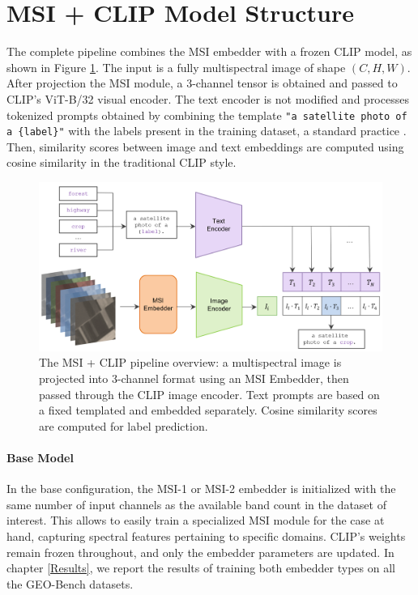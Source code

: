 \documentclass[a4paper, oneside, english]{sapthesis} %
\begin{document}
\section{MSI + CLIP Model Structure}

The complete pipeline combines the MSI embedder with a frozen CLIP model, as shown in Figure \ref{fig:model_pipeline}. The input is a fully multispectral image of shape $(C, H, W)$. After projection  the MSI module, a 3-channel tensor is obtained and passed to CLIP’s ViT-B/32 visual encoder. The text encoder is not modified and processes tokenized prompts obtained by combining the template \verb|"a satellite photo of a {label}"| with the labels present in the training dataset, a standard practice \cite{radford2021learning} \cite{liu2024remoteclip} \cite{zhang2024rs5m}. Then, similarity scores between image and text embeddings are computed using cosine similarity in the traditional CLIP style.

\begin{figure}[h]
\centering
\includegraphics[width=\textwidth]{img/msi_clip_pipeline.png}
\caption{The MSI + CLIP pipeline overview: a multispectral image is projected into 3-channel format using an MSI Embedder, then passed through the CLIP image encoder. Text prompts are based on a fixed templated and embedded separately. Cosine similarity scores are computed for label prediction.}
\label{fig:model_pipeline}
\end{figure}

\vspace{-0.5cm}

\paragraph{Base Model} In the base configuration, the MSI-1 or MSI-2 embedder is initialized with the same number of input channels as the available band count in the dataset of interest. This allows to easily train a specialized MSI module for the case at hand, capturing spectral features pertaining to specific domains. CLIP’s weights remain frozen throughout, and only the embedder parameters are updated. In chapter \ref{Results}, we report the results of training both embedder types on all the GEO-Bench datasets.
\end{document}
